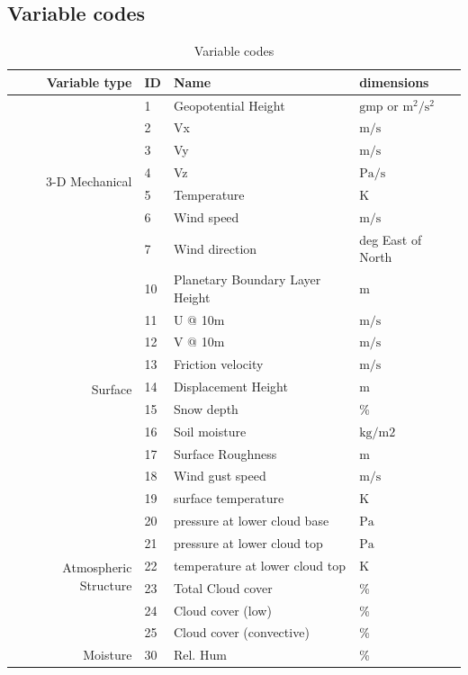\documentclass[11pt]{article}   %
\begin{document}
\subsection{Variable codes}\label{ApVar}
\begin{table}[h]\label{TabVar}
\caption{Variable codes}
\small
\begin{tabular}{| r | l | l | l |}
\hline
Variable type & ID & Name & dimensions \\
\hline
\multirow{7}{*}{3-D Mechanical} 
 &  1 & Geopotential Height & $\mathrm{gmp}$ or $\mathrm{m^2/s^2}$ \\
 &  2 & Vx & $\mathrm{m/s}$ \\
 &  3 & Vy & $\mathrm{m/s}$ \\
 &  4 & Vz & $\mathrm{Pa/s}$ \\
 &  5 & Temperature  & $\mathrm{K}$ \\
 &  6 & Wind speed & $\mathrm{m/s}$ \\
 &  7 & Wind direction &deg East of North \\
\hline
\multirow{10}{*}{Surface}
 &  10 & Planetary Boundary Layer Height & $\mathrm{m}$ \\
 &  11 & U @ 10m & $\mathrm{m/s}$ \\
 &  12 & V @ 10m & $\mathrm{m/s}$ \\
 &  13 & Friction velocity & $\mathrm{m/s}$ \\
 &  14 & Displacement Height & $\mathrm{m}$ \\
 &  15 & Snow depth & \% \\
 &  16 & Soil moisture & $\mathrm{kg/m2}$ \\
 &  17 & Surface Roughness & $\mathrm{m}$ \\
 &  18 & Wind gust speed & $\mathrm{m/s}$ \\
 &  19 & surface temperature & $\mathrm{K}$ \\
\hline
\multirow{6}{*}{Atmospheric Structure}
 &  20 & pressure at lower cloud base & $\mathrm{Pa}$ \\
 &  21 & pressure at lower cloud top & $\mathrm{Pa}$ \\
 &  22 & temperature at lower cloud top & $\mathrm{K}$ \\
 &  23 & Total Cloud cover & \% \\
 &  24 & Cloud cover (low) & \% \\
 &  25 & Cloud cover (convective) & \% \\
\hline
\multirow{4}{*}{Moisture}
  & 30 & Rel. Hum & \% \\

\end{tabular}
\end{table}
\end{document}
